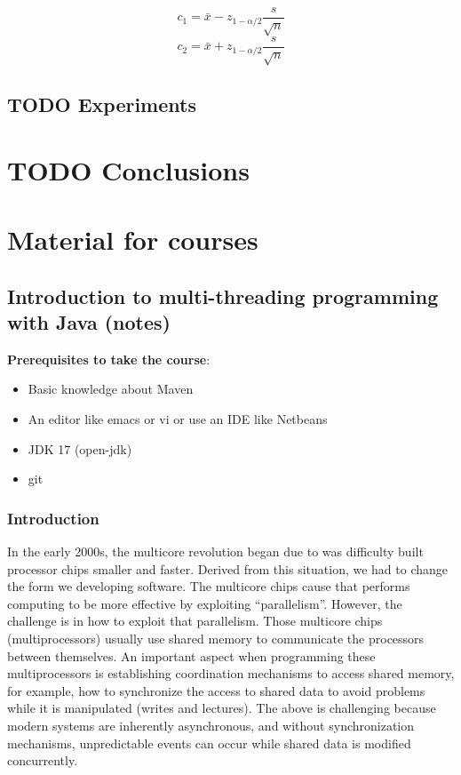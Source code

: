 \documentclass{latex/classes/thesis}
\begin{document}
\begin{equation}
c_1 = \bar{x} - z_{1 - \alpha/2}\frac{s}{\sqrt{n}}
\end{equation}
\begin{equation}
c_2 = \bar{x} + z_{1 - \alpha/2}\frac{s}{\sqrt{n}}
\end{equation}


\section{{\bfseries\sffamily TODO} Experiments}
\label{sec:org742e88b}


\chapter{{\bfseries\sffamily TODO} Conclusions}
\label{sec:org0bdbce7}


\chapter{Material for courses}
\label{sec:org6efd52b}

\section{Introduction to multi-threading programming with Java (notes)}
\label{sec:org21810ca}
\textbf{Prerequisites to take the course}:
\begin{itemize}
\item Basic knowledge about Maven
\item An editor like emacs or vi or use an IDE like Netbeans
\item JDK 17 (open-jdk)
\item git
\end{itemize}

\subsection{Introduction}
\label{sec:org45fb835}

In the early 2000s, the multicore revolution began due to was difficulty
built processor chips smaller and faster. Derived from this situation, we had
to change the form we developing software. The multicore chips cause that
performs computing to be more effective by exploiting
``parallelism''. However, the challenge is in how to exploit that
parallelism. Those multicore chips (multiprocessors) usually use shared
memory to communicate the processors between themselves. An important aspect
when programming these multiprocessors is establishing coordination
mechanisms to access shared memory, for example, how to synchronize the
access to shared data to avoid problems while it is manipulated (writes and
lectures). The above is challenging because modern systems are inherently
asynchronous, and without synchronization mechanisms, unpredictable events
can occur while shared data is modified concurrently.
\end{document}
